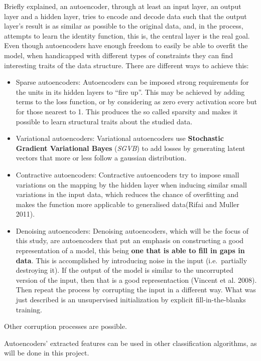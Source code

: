 \documentclass[]{article}
\begin{document}
Briefly explained, an autoencoder, through at least an input layer, an
output layer and a hidden layer, tries to encode and decode data such
that the output layer's result is as similar as possible to the original
data, and, in the process, attempts to learn the identity function, this
is, the central layer is the real goal. Even though autoencoders have
enough freedom to easily be able to overfit the model, when handicapped
with different types of constraints they can find interesting traits of
the data structure. There are different ways to achieve this:

\begin{itemize}
\item
  Sparse autoencoders: Autoencoders can be imposed strong requirements
  for the units in its hidden layers to ``fire up''. This may be
  achieved by adding terms to the loss function, or by considering as
  zero every activation score but for those nearest to 1. This produces
  the so called sparsity and makes it possible to learn structural
  traits about the studied data.
\item
  Variational autoencoders: Variational autoencoders use
  \textbf{Stochastic Gradient Variational Bayes} (\emph{SGVB}) to add
  losses by generating latent vectors that more or less follow a
  gaussian distribution.
\item
  Contractive autoencoders: Contractive autoencoders try to impose small
  variations on the mapping by the hidden layer when inducing similar
  small variations in the input data, which reduces the chance of
  overfitting and makes the function more applicable to generalised
  data(Rifai and Muller 2011).
\item
  Denoising autoencoders: Denoising autoencoders, which will be the
  focus of this study, are autoencoders that put an emphasis on
  constructing a good representation of a model, this being \textbf{one
  that is able to fill in gaps in data}. This is accomplished by
  introducing noise in the input (i.e.~partially destroying it). If the
  output of the model is similar to the uncorrupted version of the
  input, then that is a good representaction (Vincent et al. 2008). Then
  repeat the process by corrupting the input in a different way. What
  was just described is an unsupervised initialization by explicit
  fill-in-the-blanks training.
\end{itemize}

Other corruption processes are possible.

Autoencoders' extracted features can be used in other classification
algorithms, as will be done in this project.
\end{document}

